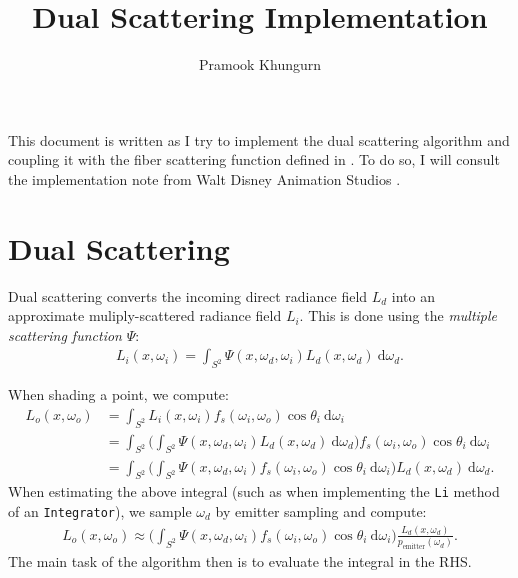 \documentclass[10pt]{article}
\title{Dual Scattering Implementation}
\author{Pramook Khungurn}
\newcommand{\dee}{\mathrm{d}}
\begin{document}
  \maketitle

  This document is written as I try to implement the dual scattering algorithm \cite{Zinke:2008} and coupling it with the fiber scattering function defined in \cite{Khungurn:2015}.  To do so, I will consult the implementation note from Walt Disney Animation Studios \cite{Sadeghi:2010}.

  \section{Dual Scattering}

  Dual scattering converts the incoming direct radiance field $L_d$ into an approximate muliply-scattered radiance field $L_i$.  This is done using the \emph{multiple scattering function} $\Psi$:
  \begin{align*}
  	L_i(x, \omega_i) = \int_{S^2} \Psi(x, \omega_d, \omega_i) L_d(x, \omega_d)\ \dee \omega_d.
  \end{align*}

  When shading a point, we compute:
  \begin{align*}
  	L_o(x,\omega_o) 
  	&= \int_{S^2} L_i(x, \omega_i) f_s(\omega_i, \omega_o) \cos \theta_i\ \dee \omega_i \\
  	&= \int_{S^2} \bigg( \int_{S^2} \Psi(x, \omega_d, \omega_i) L_d(x, \omega_d)\ \dee\omega_d \bigg) f_s(\omega_i, \omega_o) \cos \theta_i\ \dee \omega_i \\
  	&= \int_{S^2} \bigg( \int_{S^2} \Psi(x, \omega_d, \omega_i)  f_s(\omega_i, \omega_o) \cos \theta_i\ \dee \omega_i\bigg) L_d(x, \omega_d)\ \dee \omega_d.
  \end{align*}
  When estimating the above integral (such as when implementing the \texttt{Li} method of an \texttt{Integrator}), we sample $\omega_d$ by emitter sampling and compute:
  \begin{align}
  	L_o(x,\omega_o) 
  	\approx \bigg( \int_{S^2} \Psi(x, \omega_d, \omega_i) f_s(\omega_i, \omega_o) \cos \theta_i\ \dee \omega_i\bigg) \frac{L_d(x, \omega_d)}{p_{\mathrm{emitter}}(\omega_d)} \label{Li-expression}.
  \end{align}
  The main task of the algorithm then is to evaluate the integral in the RHS.
\end{document}
